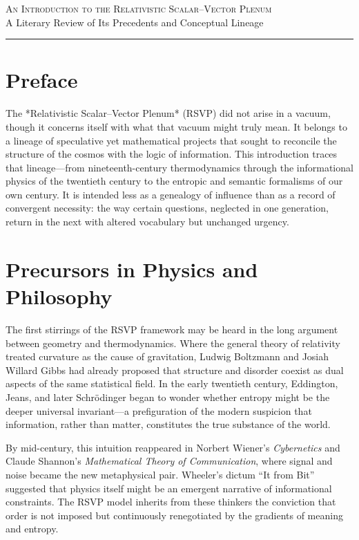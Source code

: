 \documentclass[12pt]{article}
\begin{document}
\begin{center}
{\Large\textsc{An Introduction to the Relativistic Scalar--Vector Plenum}}\\[1ex]
{\small A Literary Review of Its Precedents and Conceptual Lineage}\\[2ex]
{\rule{0.4\textwidth}{0.4pt}}
\end{center}

\section*{Preface}

The *Relativistic Scalar--Vector Plenum* (RSVP) did not arise in a vacuum, though it concerns itself with what that vacuum might truly mean. 
It belongs to a lineage of speculative yet mathematical projects that sought to reconcile the structure of the cosmos with the logic of information. 
This introduction traces that lineage---from nineteenth-century thermodynamics through the informational physics of the twentieth century to the entropic and semantic formalisms of our own century. 
It is intended less as a genealogy of influence than as a record of convergent necessity: the way certain questions, neglected in one generation, return in the next with altered vocabulary but unchanged urgency.

\section{Precursors in Physics and Philosophy}

The first stirrings of the RSVP framework may be heard in the long argument between geometry and thermodynamics. 
Where the general theory of relativity treated curvature as the cause of gravitation, Ludwig Boltzmann and Josiah Willard Gibbs had already proposed that structure and disorder coexist as dual aspects of the same statistical field. 
In the early twentieth century, Eddington, Jeans, and later Schrödinger began to wonder whether entropy might be the deeper universal invariant---a prefiguration of the modern suspicion that information, rather than matter, constitutes the true substance of the world.

By mid-century, this intuition reappeared in Norbert Wiener's \textit{Cybernetics} and Claude Shannon's \textit{Mathematical Theory of Communication}, where signal and noise became the new metaphysical pair. 
Wheeler's dictum ``It from Bit'' suggested that physics itself might be an emergent narrative of informational constraints. 
The RSVP model inherits from these thinkers the conviction that order is not imposed but continuously renegotiated by the gradients of meaning and entropy.
\end{document}
